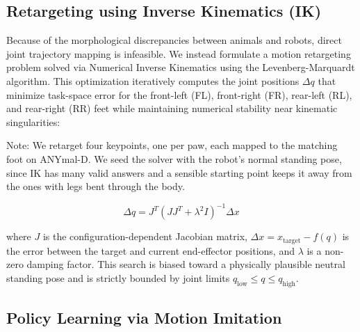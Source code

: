 \documentclass{article}
\theoremstyle{plain}
\theoremstyle{definition}
\theoremstyle{remark}
\begin{document}
\subsection{Retargeting using Inverse Kinematics (IK)}
\label{subsec:retarget}

Because of the morphological discrepancies between animals and robots, direct joint trajectory mapping is infeasible. We instead formulate a motion retargeting problem solved via Numerical Inverse Kinematics using the Levenberg-Marquardt algorithm. This optimization iteratively computes the joint positions $\Delta q$ that minimize task-space error for the front-left (FL), front-right (FR), rear-left (RL), and rear-right (RR) feet while maintaining numerical stability near kinematic singularities:

Note: We retarget four keypoints, one per paw, each mapped to the matching foot on ANYmal-D. We seed the solver with the robot's normal standing pose, since IK has many valid answers and a sensible starting point keeps it away from the ones with legs bent through the body.

\begin{equation}
\Delta q = J^T(JJ^T + \lambda^2 I)^{-1}\Delta x
\end{equation}

where $J$ is the configuration-dependent Jacobian matrix, $\Delta x = x_{\text{target}} - f(q)$ is the error between the target and current end-effector positions, and $\lambda$ is a non-zero damping factor. This search is biased toward a physically plausible neutral standing pose and is strictly bounded by joint limits $q_{\text{low}} \le q \le q_{\text{high}}$.


\subsection{Policy Learning via Motion Imitation}
\label{subsec:policy}
 
\end{document}
